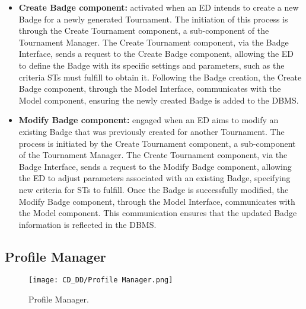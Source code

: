 \begin{itemize}
    \item \textbf{Create Badge component:} activated when an ED intends to create a new Badge for a newly generated Tournament. The initiation of this process is through the Create Tournament component, a sub-component of the Tournament Manager. The Create Tournament component, via the Badge Interface, sends a request to the Create Badge component, allowing the ED to define the Badge with its specific settings and parameters, such as the criteria STs must fulfill to obtain it. Following the Badge creation, the Create Badge component, through the Model Interface, communicates with the Model component, ensuring the newly created Badge is added to the DBMS.
    \item \textbf{Modify Badge component:} engaged when an ED aims to modify an existing Badge that was previously created for another Tournament. The process is initiated by the Create Tournament component, a sub-component of the Tournament Manager. The Create Tournament component, via the Badge Interface, sends a request to the Modify Badge component, allowing the ED to adjust parameters associated with an existing Badge, specifying new criteria for STs to fulfill. Once the Badge is successfully modified, the Modify Badge component, through the Model Interface, communicates with the Model component. This communication ensures that the updated Badge information is reflected in the DBMS.
\end{itemize}

\subsection{Profile Manager}
\label{subsec:profile_manager}%

\begin{figure}[H]
    \begin{center}
        \texttt{[image: CD\_DD/Profile Manager.png]}
        \caption{Profile Manager.}
        \label{fig:profile_manager}%
    \end{center}
\end{figure}

